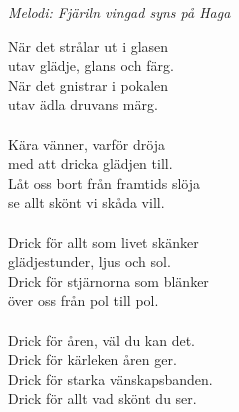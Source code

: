 {\footnotesize\textit{Melodi: Fjäriln vingad syns på Haga}}\par
\vspace{10pt}
När det strålar ut i glasen\\
utav glädje, glans och färg.\\
När det gnistrar i pokalen\\
utav ädla druvans märg.\\
\\
Kära vänner, varför dröja\\
med att dricka glädjen till.\\
Låt oss bort från framtids slöja\\
se allt skönt vi skåda vill.\\
\\
Drick för allt som livet skänker\\
glädjestunder, ljus och sol.\\
Drick för stjärnorna som blänker\\
över oss från pol till pol.\\
\\
Drick för åren, väl du kan det.\\
Drick för kärleken åren ger.\\
Drick för starka vänskapsbanden.\\
Drick för allt vad skönt du ser.
